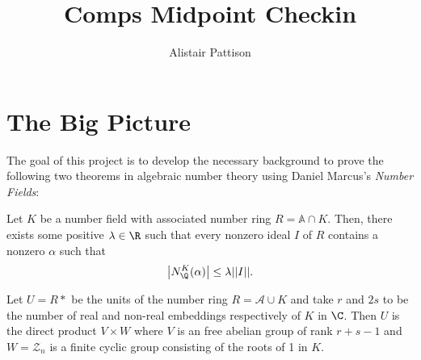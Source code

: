 \documentclass{ali-hw}
\title{Comps Midpoint Checkin}
\author{Alistair Pattison}
\begin{document}


\maketitle

\section{The Big Picture}

The goal of this project is to develop the necessary background to prove the following two theorems in algebraic number theory using Daniel Marcus's \textit{Number Fields}:

\begin{theorem}
	Let $K$ be a number field with associated number ring $R = \mathbb A \cap K$. Then, there exists some positive $\lambda \in \R$ such that every nonzero ideal $I$ of $R$ contains a nonzero $\alpha$ such that
	\begin{equation}
		\left| N_\Q^K(\alpha) \right| \leq \lambda || I ||.
	\end{equation}
\end{theorem}

\begin{theorem}
	Let $U = R*$ be the units of the number ring $R = \mathcal A \cup K$ and take $r$ and $2s$ to be the number of real and non-real embeddings respectively of $K$ in $\C$. Then $U$ is the direct product $V \times W$ where $V$ is an free abelian group of rank $r + s - 1$ and $W = \mathcal Z_n$ is a finite cyclic group consisting of the roots of 1 in $K$.
\end{theorem}
\end{document}
